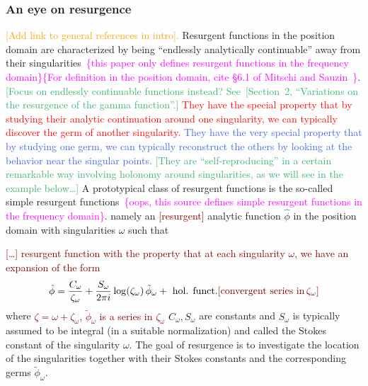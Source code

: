 \documentclass{article}
\newcommand{\series}[1]{\tilde{#1}}
\theoremstyle{definition}
\theoremstyle{plain}
\begin{document}
\subsubsection{An eye on resurgence}\label{apx:eye-res-airy}
\textcolor{orange}{[Add link to general references in intro].} Resurgent functions in the position domain are characterized by being ``endlessly analytically continuable'' away from their singularities~\textcolor{magenta}{\cite[Section~1.2.2]{intro-to-ecalle}\{this paper only defines resurgent functions in the frequency domain\}\{For definition in the position domain, cite \S 6.1 of Mitschi and Sauzin~\cite{diverg-resurg-i}\}}. \textcolor{MediumSeaGreen}{[Focus on endlessly continuable functions instead? See~[Section~2, ``Variations on the resurgence of the gamma function''.]} \textcolor{red}{They have the special property that by studying their analytic continuation around one singularity, we can typically discover the germ of another singularity.} \textcolor{RoyalBlue}{They have the very special property that by studying one germ, we can typically reconstruct the others by looking at the behavior near the singular points.} \textcolor{MediumSeaGreen}{[They are ``self-reproducing'' in a certain remarkable way involving holonomy around singularities, as we will see in the example below\ldots]} A prototypical class of resurgent functions is the so-called simple resurgent functions~\textcolor{magenta}{\cite[Section~1.2.3]{intro-to-ecalle}\{oops, this source defines simple resurgent functions in the frequency domain\}}.  namely an \textcolor{Maroon}{[resurgent]} analytic function $\hat{\phi}$ in the position domain with singularities $\omega$ such that

\textcolor{Maroon}{[\ldots] resurgent function with the property that at each singularity $\omega$, we have an expansion of the form}
\begin{align*}
    \hat{\phi} = \frac{C_\omega}{\zeta_\omega}+\frac{S_\omega}{2\pi i} \log(\zeta_\omega)\,\series{\phi}_\omega + \text{ hol. funct.} \textcolor{Maroon}{[\text{convergent series in}\,\zeta_\omega]}
\end{align*}
where \textcolor{Maroon}{$\zeta = \omega + \zeta_\omega$, $\series{\phi}_\omega$ is a series in $\zeta_\omega$} $C_\omega, S_\omega$ are constants and $S_\omega$ is typically assumed to be integral (in a suitable normalization) and called the Stokes constant of the singularity $\omega$. The goal of resurgence is to investigate the location of the singularities together with their Stokes constants and the corresponding germs $\series{\phi}_\omega$.  
\end{document}
